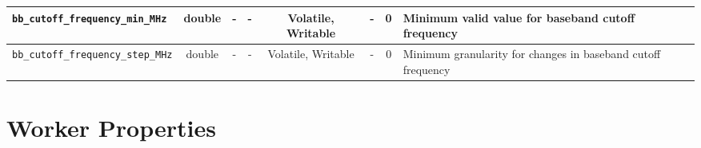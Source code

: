 \documentclass{article}
\begin{document}
\begin{landscape}
\begin{scriptsize}
\begin{tabular}{|p{4cm}|c|c|c|c|c|c|p{8cm}|}
			\hline
			\verb+bb_cutoff_frequency_min_MHz+  & double & -        & -          & Volatile, Writable & -           & 0       & Minimum valid value for baseband cutoff frequency                                                                                           \\
			\hline
			\verb+bb_cutoff_frequency_step_MHz+ & double & -        & -          & Volatile, Writable & -           & 0       & Minimum granularity for changes in baseband cutoff frequency                                                                                \\
			\hline
		\end{tabular}
	\end{scriptsize}

	\section*{Worker Properties}

\end{landscape}
\end{document}
